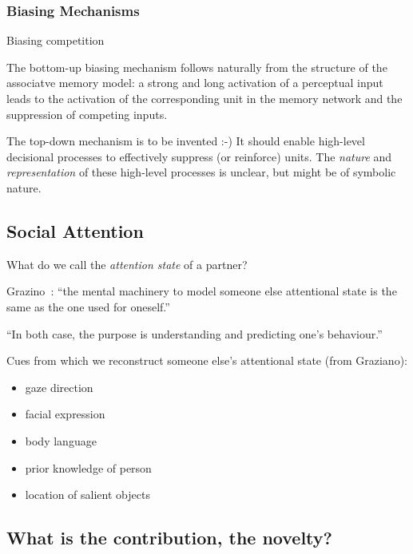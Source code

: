 \documentclass[a4paper]{article}
\begin{document}
\subsubsection{Biasing Mechanisms}

Biasing competition~\cite{beck2009top}

The bottom-up biasing mechanism follows naturally from the structure of the
associatve memory model: a strong and long activation of a perceptual input
leads to the activation of the corresponding unit in the memory network and the
suppression of competing inputs.

The top-down mechanism is to be invented :-)
It should enable high-level decisional processes to effectively suppress (or
reinforce) units. The \emph{nature} and \emph{representation} of these
high-level processes is unclear, but might be of symbolic nature.



\subsection{Social Attention}

What do we call the \emph{attention state} of a partner?


Grazino~\cite{graziano2013consciousness}: ``the mental machinery to model
someone else attentional state is the same as the one used for oneself.''

``In both case, the purpose is understanding and predicting one's behaviour.''

Cues from which we reconstruct someone else's attentional state (from Graziano):
\begin{itemize}
    \item gaze direction
    \item facial expression
    \item body language
    \item prior knowledge of person
    \item location of salient objects
\end{itemize}

\subsection{What is the contribution, the novelty?}



\end{document}
